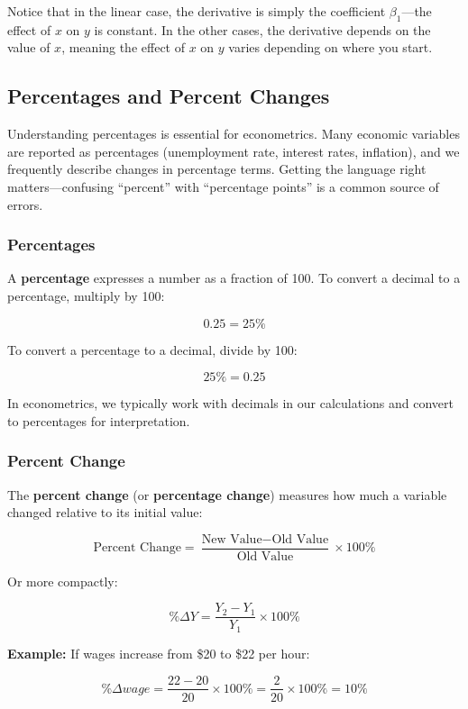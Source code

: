 \documentclass[
  letterpaper,
  DIV=11,
  numbers=noendperiod]{scrreprt}
\begin{document}
Notice that in the linear case, the derivative is simply the coefficient
\(\beta_1\)---the effect of \(x\) on \(y\) is constant. In the other
cases, the derivative depends on the value of \(x\), meaning the effect
of \(x\) on \(y\) varies depending on where you start.

\subsection{Percentages and Percent
Changes}\label{percentages-and-percent-changes}

Understanding percentages is essential for econometrics. Many economic
variables are reported as percentages (unemployment rate, interest
rates, inflation), and we frequently describe changes in percentage
terms. Getting the language right matters---confusing ``percent'' with
``percentage points'' is a common source of errors.

\subsubsection{Percentages}\label{percentages}

A \textbf{percentage} expresses a number as a fraction of 100. To
convert a decimal to a percentage, multiply by 100:

\[0.25 = 25\%\]

To convert a percentage to a decimal, divide by 100:

\[25\% = 0.25\]

In econometrics, we typically work with decimals in our calculations and
convert to percentages for interpretation.

\subsubsection{Percent Change}\label{percent-change}

The \textbf{percent change} (or \textbf{percentage change}) measures how
much a variable changed relative to its initial value:

\[\text{Percent Change} = \frac{\text{New Value} - \text{Old Value}}{\text{Old Value}} \times 100\%\]

Or more compactly:

\[\%\Delta Y = \frac{Y_2 - Y_1}{Y_1} \times 100\%\]

\textbf{Example:} If wages increase from \$20 to \$22 per hour:

\[\%\Delta wage = \frac{22 - 20}{20} \times 100\% = \frac{2}{20} \times 100\% = 10\%\]
\end{document}
